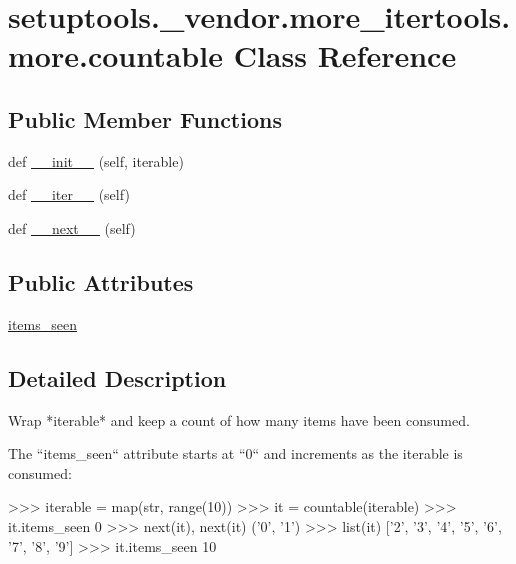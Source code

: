 \hypertarget{classsetuptools_1_1__vendor_1_1more__itertools_1_1more_1_1countable}{}\section{setuptools.\+\_\+vendor.\+more\+\_\+itertools.\+more.\+countable Class Reference}
\label{classsetuptools_1_1__vendor_1_1more__itertools_1_1more_1_1countable}
\subsection*{Public Member Functions}
\begin{DoxyCompactItemize}
\item 
def \hyperlink{classsetuptools_1_1__vendor_1_1more__itertools_1_1more_1_1countable_a0eea011b5d6298a825c2290a21c4350d}{\+\_\+\+\_\+init\+\_\+\+\_\+} (self, iterable)
\item 
def \hyperlink{classsetuptools_1_1__vendor_1_1more__itertools_1_1more_1_1countable_af19ec53803d0f06f89aedb7a77df3108}{\+\_\+\+\_\+iter\+\_\+\+\_\+} (self)
\item 
def \hyperlink{classsetuptools_1_1__vendor_1_1more__itertools_1_1more_1_1countable_ae239b691ae4be573c0de278512d61371}{\+\_\+\+\_\+next\+\_\+\+\_\+} (self)
\end{DoxyCompactItemize}
\subsection*{Public Attributes}
\begin{DoxyCompactItemize}
\item 
\hyperlink{classsetuptools_1_1__vendor_1_1more__itertools_1_1more_1_1countable_a6911177a79e1ac4825d6adfda8c13860}{items\+\_\+seen}
\end{DoxyCompactItemize}


\subsection{Detailed Description}
\begin{DoxyVerb}Wrap *iterable* and keep a count of how many items have been consumed.

The ``items_seen`` attribute starts at ``0`` and increments as the iterable
is consumed:

    >>> iterable = map(str, range(10))
    >>> it = countable(iterable)
    >>> it.items_seen
    0
    >>> next(it), next(it)
    ('0', '1')
    >>> list(it)
    ['2', '3', '4', '5', '6', '7', '8', '9']
    >>> it.items_seen
    10
\end{DoxyVerb}
 

